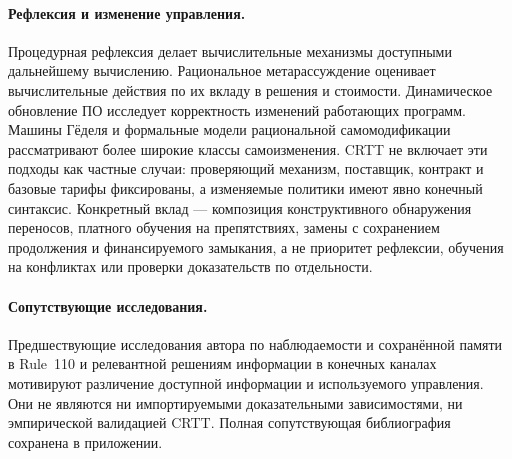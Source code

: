 \paragraph{Рефлексия и изменение управления.}
Процедурная рефлексия \cite{smith1984} делает вычислительные механизмы доступными дальнейшему вычислению. Рациональное метарассуждение \cite{russell1991} оценивает вычислительные действия по их вкладу в решения и стоимости. Динамическое обновление ПО \cite{stoyle2007} исследует корректность изменений работающих программ. Машины Гёделя \cite{schmidhuber2007} и формальные модели рациональной самомодификации \cite{everitt2016} рассматривают более широкие классы самоизменения. CRTT не включает эти подходы как частные случаи: проверяющий механизм, поставщик, контракт и базовые тарифы фиксированы, а изменяемые политики имеют явно конечный синтаксис. Конкретный вклад --- композиция конструктивного обнаружения переносов, платного обучения на препятствиях, замены с сохранением продолжения и финансируемого замыкания, а не приоритет рефлексии, обучения на конфликтах или проверки доказательств по отдельности.

\paragraph{Сопутствующие исследования.}
Предшествующие исследования автора по наблюдаемости и сохранённой памяти в Rule~110 \cite{strand110observer2026,strand110memory2026} и релевантной решениям информации в конечных каналах \cite{strandcontrol2026} мотивируют различение доступной информации и используемого управления. Они не являются ни импортируемыми доказательными зависимостями, ни эмпирической валидацией CRTT. Полная сопутствующая библиография сохранена в приложении.


